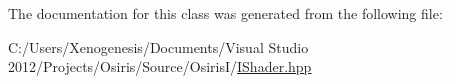 The documentation for this class was generated from the following file\-:\begin{DoxyCompactItemize}
\item 
C\-:/\-Users/\-Xenogenesis/\-Documents/\-Visual Studio 2012/\-Projects/\-Osiris/\-Source/\-Osiris\-I/\hyperlink{_i_shader_8hpp}{I\-Shader.\-hpp}\end{DoxyCompactItemize}
